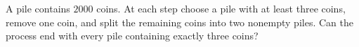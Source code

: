 A pile contains $2000$ coins. At each step choose a pile with at least three coins, remove one coin, and split the remaining coins into two nonempty piles. Can the process end with every pile containing exactly three coins?
